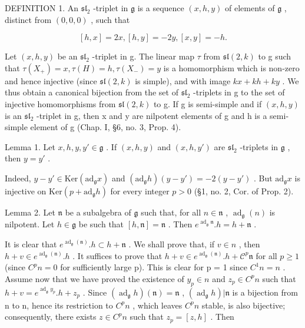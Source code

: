 DEFINITION 1. An \(\mathfrak{sl}_2\) -triplet in \(\mathfrak{g}\) is a sequence \((x, h, y)\) of elements of \(\mathfrak{g}\) , distinct from \((0, 0, 0)\) , such that

\[
[ h, x ] = 2 x, [ h, y ] = - 2 y, [ x, y ] = - h.
\]

Let \((x,h,y)\) be an \(\mathfrak{sl}_{2}\) -triplet in g. The linear map \(\tau\) from \(\mathfrak{sl}(2,k)\) to g such that \(\tau(X_{+}) = x, \tau(H) = h, \tau(X_{-}) = y\) is a homomorphism which is non-zero and hence injective (since \(\mathfrak{sl}(2,k)\) is simple), and with image \(kx + kh + ky\) . We thus obtain a canonical bijection from the set of \(\mathfrak{sl}_{2}\) -triplets in g to the set of injective homomorphisms from \(\mathfrak{sl}(2,k)\) to g. If g is semi-simple and if \((x,h,y)\) is an \(\mathfrak{sl}_{2}\) -triplet in g, then x and y are nilpotent elements of g and h is a semi-simple element of g (Chap. I, §6, no. 3, Prop. 4).

Lemma 1. Let \(x, h, y, y' \in \mathfrak{g}\) . If \((x, h, y)\) and \((x, h, y')\) are \(\mathfrak{sl}_2\) -triplets in \(\mathfrak{g}\) , then \(y = y'\) .

Indeed, \(y - y' \in \mathrm{Ker}(\mathrm{ad}_{\mathfrak{g}}x)\) and \((\mathrm{ad}_{\mathfrak{g}}h)(y - y') = -2(y - y')\) . But \(\mathrm{ad}_{\mathfrak{g}}x\) is injective on \(\mathrm{Ker}(p + \mathrm{ad}_{\mathfrak{g}}h)\) for every integer \(p > 0\) (§1, no. 2, Cor. of Prop. 2).

Lemma 2. Let \(\mathfrak{n}\) be a subalgebra of \(\mathfrak{g}\) such that, for all \(n\in \mathfrak{n}\) , \(\operatorname{ad}_{\mathfrak{g}}(n)\) is nilpotent. Let \(h\in \mathfrak{g}\) be such that \([h,\mathfrak{n}] = \mathfrak{n}\) . Then \(e^{\operatorname{ad}_{\mathfrak{g}}\mathfrak{n}}.h = h + \mathfrak{n}\) .

It is clear that \(e^{\operatorname{ad}_{\mathfrak{g}}(\mathfrak{n})}.h \subset h + \mathfrak{n}\) . We shall prove that, if \(v \in n\) , then \(h + v \in e^{\operatorname{ad}_{\mathfrak{g}}(\mathfrak{n})}.h\) . It suffices to prove that \(h + v \in e^{\operatorname{ad}_{\mathfrak{g}}(\mathfrak{n})}.h + \mathscr {C} ^ {p} \mathfrak {n}\) for all \(p \geq 1\) (since \(C^{p}n = 0\) for sufficiently large p). This is clear for p = 1 since \(C^{1}n = n\) . Assume now that we have proved the existence of \(y_{p} \in n\) and \(z_{p} \in C^{p}n\) such that \(h + v = e^{\operatorname{ad}_{\mathfrak{g}}y_{p}}.h + z_{p}\) . Since \((\operatorname{ad}_{\mathfrak{g}}h)(\mathfrak{n}) = \mathfrak{n}\) , \((\operatorname{ad}_{\mathfrak{g}}h)|\mathfrak{n}\) is a bijection from n to n, hence its restriction to \(C^{p}n\) , which leaves \(C^{p}n\) stable, is also bijective; consequently, there exists \(z \in C^{p}n\) such that \(z_{p} = [z, h]\) . Then

